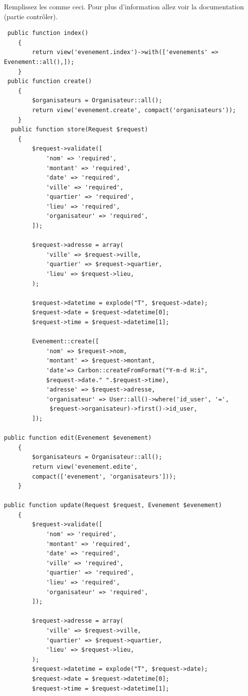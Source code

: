 \documentclass[12pt,a4paper]{article}
\begin{document}
Remplissez les comme ceci. Pour plus d'information allez voir la documentation (partie contrôler).
\begin{verbatim}
 public function index()
    {
        return view('evenement.index')->with(['evenements' => Evenement::all(),]);
    }
 public function create()
    {
        $organisateurs = Organisateur::all();
        return view('evenement.create', compact('organisateurs'));
    }
  public function store(Request $request)
    {
        $request->validate([
            'nom' => 'required',
            'montant' => 'required',
            'date' => 'required',
            'ville' => 'required',
            'quartier' => 'required',
            'lieu' => 'required',
            'organisateur' => 'required',
        ]);

        $request->adresse = array(
            'ville' => $request->ville,
            'quartier' => $request->quartier,
            'lieu' => $request->lieu,
        );

        $request->datetime = explode("T", $request->date);
        $request->date = $request->datetime[0];
        $request->time = $request->datetime[1];

        Evenement::create([
            'nom' => $request->nom,
            'montant' => $request->montant,
            'date'=> Carbon::createFromFormat("Y-m-d H:i", 
            $request->date." ".$request->time),
            'adresse' => $request->adresse,
            'organisateur' => User::all()->where('id_user', '=',
             $request->organisateur)->first()->id_user,
        ]);

public function edit(Evenement $evenement)
    {
        $organisateurs = Organisateur::all();
        return view('evenement.edite', 
        compact(['evenement', 'organisateurs']));
    }

public function update(Request $request, Evenement $evenement)
    {
        $request->validate([
            'nom' => 'required',
            'montant' => 'required',
            'date' => 'required',
            'ville' => 'required',
            'quartier' => 'required',
            'lieu' => 'required',
            'organisateur' => 'required',
        ]);

        $request->adresse = array(
            'ville' => $request->ville,
            'quartier' => $request->quartier,
            'lieu' => $request->lieu,
        );
        $request->datetime = explode("T", $request->date);
        $request->date = $request->datetime[0];
        $request->time = $request->datetime[1];


\end{verbatim}
\end{document}
